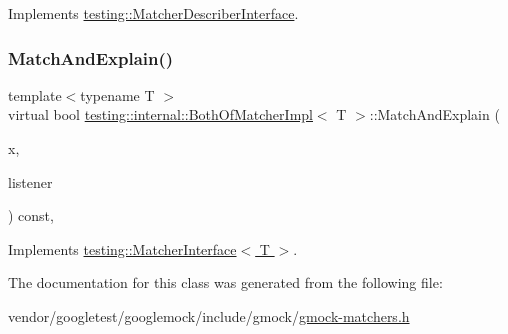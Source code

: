 Implements \hyperlink{classtesting_1_1_matcher_describer_interface_ad9f861588bd969b6e3e717f13bb94e7b}{testing\+::\+Matcher\+Describer\+Interface}.

\mbox{\label{classtesting_1_1internal_1_1_both_of_matcher_impl_a4f3e5edf69d168fef8bec577313748f4}} 
\subsubsection{\texorpdfstring{Match\+And\+Explain()}{MatchAndExplain()}}
{\footnotesize\ttfamily template$<$typename T $>$ \\
virtual bool \hyperlink{classtesting_1_1internal_1_1_both_of_matcher_impl}{testing\+::internal\+::\+Both\+Of\+Matcher\+Impl}$<$ T $>$\+::Match\+And\+Explain (\begin{DoxyParamCaption}\item[{T}]{x,  }\item[{\hyperlink{classtesting_1_1_match_result_listener}{Match\+Result\+Listener} $\ast$}]{listener }\end{DoxyParamCaption}) const\hspace{0.3cm}{\ttfamily [inline]}, {\ttfamily [virtual]}}



Implements \hyperlink{classtesting_1_1_matcher_interface_a296b43607cd99d60365f0e6a762777cf}{testing\+::\+Matcher\+Interface$<$ T $>$}.



The documentation for this class was generated from the following file\+:\begin{DoxyCompactItemize}
\item 
vendor/googletest/googlemock/include/gmock/\hyperlink{gmock-matchers_8h}{gmock-\/matchers.\+h}\end{DoxyCompactItemize}

